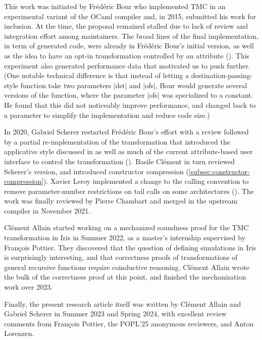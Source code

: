 \begin{acks}
  This work was initiated by Frédéric Bour who implemented TMC in an
  experimental variant of the OCaml compiler and, in 2015, submitted his work
  for inclusion. At the time, the proposal remained stalled due to lack
  of review and integration effort among maintainers. The broad lines
  of the final implementation, in term of generated code, were already
  in Frédéric Bour's initial version, as well as the idea to have an
  opt-in transformation controlled by an attribute
  (). This experiment also generated
  performance data that motivated us to push further. (One notable
  technical difference is that instead of letting a destination-passing-style
  function take two parameters \ocaml|dst| and \ocaml|ofs|, Bour
  would generate several versions of the function,
  where the parameter \ocaml|ofs| was specialized to
  a constant. He found that this did not noticeably improve
  performance, and changed back to a parameter to simplify the
  implementation and reduce code size.)

  In 2020, Gabriel Scherer restarted Frédéric Bour's effort with
  a review followed by a partial re-implementation of the
  transformation that introduced the applicative style discussed in
   as well as
  much of the current attribute-based user interface to control the
  transformation
  (). Basile
  Clément in turn reviewed Scherer's version, and introduced
  constructor compression
  (\cref{subsec:constructor-compression}). Xavier Leroy implemented
  a change to the \OCaml calling convention to remove parameter-number
  restrictions on tail calls on some architectures
  (). The work was
  finally reviewed by Pierre Chambart and merged in the upstream
  \OCaml compiler in November 2021.

  Clément Allain started working on a mechanized soundness proof for
  the TMC transformation in Iris in Summer 2022, as a master's
  internship supervised by François Pottier. They discovered that the
  question of defining simulations in Iris is surprisingly
  interesting, and that correctness proofs of transformations of
  general recursive functions require coinductive reasoning. Clément
  Allain wrote the bulk of the correctness proof at this point, and
  finished the mechanization work over 2023.

  Finally, the present research article itself was written by Clément
  Allain and Gabriel Scherer in Summer 2023 and Spring 2024, with
  excellent review comments from François Pottier, the POPL'25
  anonymous reviewers, and Anton Lorenzen.
\end{acks}

